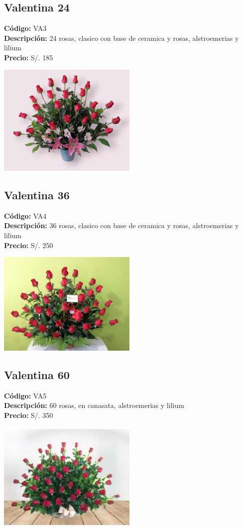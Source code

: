 \subsection*{Valentina 24}
\textbf{Código:} VA3 \\
\textbf{Descripción:} 24 rosas, clasico con base de ceramica y rosas, alstroemerias y lilium \\
\textbf{Precio:} S/. 185 \\
\begin{center}
\includegraphics[width=0.5\textwidth]{imagenes_extraidas/image_10_5}
\end{center}
\subsection*{Valentina 36}
\textbf{Código:} VA4 \\
\textbf{Descripción:} 36 rosas, clasico con base de ceramica y rosas, alstroemerias y lilium \\
\textbf{Precio:} S/. 250 \\
\begin{center}
\includegraphics[width=0.5\textwidth]{imagenes_extraidas/image_11_3}
\end{center}
\subsection*{Valentina 60}
\textbf{Código:} VA5 \\
\textbf{Descripción:} 60 rosas, en canasata, alstroemerias y lilium \\
\textbf{Precio:} S/. 350 \\
\begin{center}
\includegraphics[width=0.5\textwidth]{imagenes_extraidas/image_11_4}
\end{center}
